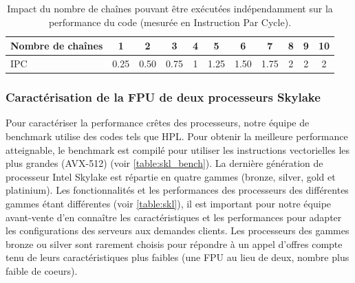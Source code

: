     \begin{table}[h!]
    \centering
    \normalsize
    \begin{tabular}{|l|c|c|c|c|c|c|c|c|c|c|}
    \hline
    Nombre de chaînes & 1 & 2 & 3 & 4 & 5 & 6 & 7 & 8 & 9 & 10 \\ \hline
    IPC & 0.25 & 0.50 & 0.75 & 1 & 1.25 & 1.50 & 1.75 & 2 & 2 & 2 \\ \hline
    \end{tabular}%
    \caption{Impact du nombre de chaînes pouvant être exécutées indépendamment sur la performance du code (mesurée en Instruction Par Cycle).}
    \label{tab_kg_depth}
    \end{table}





    \subsubsection{Caractérisation de la FPU de deux processeurs Skylake}

        Pour caractériser la performance crêtes des processeurs, notre équipe de benchmark utilise des codes tels que HPL. Pour obtenir la meilleure performance atteignable, le benchmark est compilé pour utiliser les instructions vectorielles les plus grandes (AVX-512) (voir \autoref{table:skl_bench}). La dernière génération de processeur Intel Skylake est répartie en quatre gammes (bronze, silver, gold et platinium). Les fonctionnalités et les performances des processeurs des différentes gammes étant différentes (voir \autoref{table:skl}), il est important pour notre équipe avant-vente d'en connaître les caractéristiques et les performances pour adapter les configurations des serveurs aux demandes clients. Les processeurs des gammes bronze ou silver sont rarement choisis pour répondre à un appel d'offres compte tenu de leurs caractéristiques plus faibles (une FPU au lieu de deux, nombre plus faible de coeurs).
        
